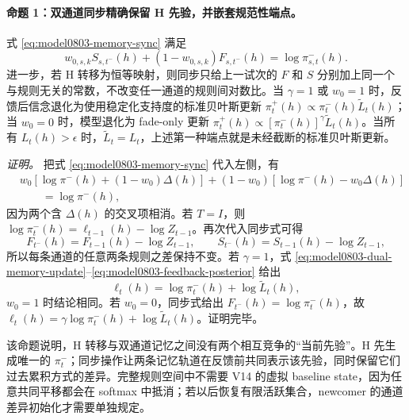 \paragraph{命题 1：双通道同步精确保留 H 先验，并嵌套规范性端点。}
式 \ref{eq:model0803-memory-sync} 满足
\begin{equation}
    w_{0,s,k}S_{s,t^-}(h)
    +(1-w_{0,s,k})F_{s,t^-}(h)
    =\log\pi^-_{s,t}(h).
    \label{eq:model0803-memory-sync-identity}
\end{equation}
进一步，若 H 转移为恒等映射，则同步只给上一试次的 $F$ 和 $S$ 分别加上同一个与规则无关的常数，不改变任一通道的规则间对数比。当 $\gamma=1$ 或 $w_0=1$ 时，反馈后信念退化为使用稳定化支持度的标准贝叶斯更新 $\pi^+_t(h)\propto\pi^-_t(h)\widetilde L_t(h)$；当 $w_0=0$ 时，模型退化为 fade-only 更新 $\pi^+_t(h)\propto[\pi^-_t(h)]^\gamma\widetilde L_t(h)$。当所有 $L_t(h)>\epsilon$ 时，$\widetilde L_t=L_t$，上述第一种端点就是未经截断的标准贝叶斯更新。

\textit{证明。}
把式 \ref{eq:model0803-memory-sync} 代入左侧，有
\begin{align}
    &w_0[\log\pi^-(h)+(1-w_0)\Delta(h)]
    +(1-w_0)[\log\pi^-(h)-w_0\Delta(h)]\\
    &\qquad=\log\pi^-(h),
\end{align}
因为两个含 $\Delta(h)$ 的交叉项相消。若 $T=I$，则 $\log\pi^-_{t}(h)=\ell_{t-1}(h)-\log Z_{t-1}$。再次代入同步式可得
\begin{equation}
    F_{t^-}(h)=F_{t-1}(h)-\log Z_{t-1},
    \qquad
    S_{t^-}(h)=S_{t-1}(h)-\log Z_{t-1},
\end{equation}
所以每条通道的任意两条规则之差保持不变。若 $\gamma=1$，式 \ref{eq:model0803-dual-memory-update}--\ref{eq:model0803-feedback-posterior} 给出
\begin{equation}
    \ell_t(h)=\log\pi^-_t(h)+\log\widetilde L_t(h),
\end{equation}
$w_0=1$ 时结论相同。若 $w_0=0$，同步式给出 $F_{t^-}(h)=\log\pi^-_t(h)$，故 $\ell_t(h)=\gamma\log\pi^-_t(h)+\log\widetilde L_t(h)$。证明完毕。

该命题说明，H 转移与双通道记忆之间没有两个相互竞争的“当前先验”。H 先生成唯一的 $\pi^-_t$；同步操作让两条记忆轨道在反馈前共同表示该先验，同时保留它们过去累积方式的差异。完整规则空间中不需要 V14 的虚拟 baseline state，因为任意共同平移都会在 softmax 中抵消；若以后恢复有限活跃集合，newcomer 的通道差异初始化才需要单独规定。

